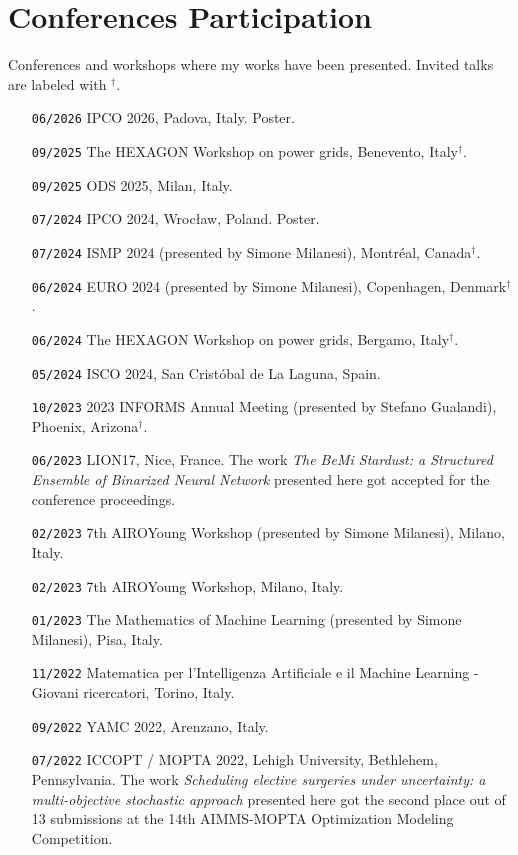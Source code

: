 \documentclass[11pt,a4paper]{article}
\begin{document}
\section*{Conferences Participation}
Conferences and workshops where my works have been presented. Invited talks are labeled with $^\dagger$.
\begin{itemize}[labelwidth=*,align=left, labelwidth=!]
\item[\texttt{06/2026}] IPCO 2026, Padova, Italy. Poster.
    \item[\texttt{09/2025}] The HEXAGON Workshop on power grids, Benevento, Italy$^\dagger$.
    \item[\texttt{09/2025}] ODS 2025, Milan, Italy. 
    \item[\texttt{07/2024}] IPCO 2024, Wrocław, Poland. Poster.
    \item[\texttt{07/2024}] ISMP 2024 (presented by Simone Milanesi), Montréal, Canada$^\dagger$.
    \item[\texttt{06/2024}] EURO 2024 (presented by Simone Milanesi), Copenhagen, Denmark$^\dagger$. 
    \item[\texttt{06/2024}] The HEXAGON Workshop on power grids, Bergamo, Italy$^\dagger$.
    \item[\texttt{05/2024}] ISCO 2024, San Cristóbal de La Laguna, Spain.
    \item[\texttt{10/2023}] 2023 INFORMS Annual Meeting (presented by Stefano Gualandi), Phoenix, Arizona$^\dagger$.
    \item[\texttt{06/2023}] LION17, Nice, France. The work \emph{The BeMi Stardust: a Structured Ensemble of Binarized Neural Network} presented here got accepted for the conference proceedings.
    \item[\texttt{02/2023}] 7th AIROYoung Workshop (presented by Simone Milanesi), Milano, Italy.
    \item[\texttt{02/2023}] 7th AIROYoung Workshop, Milano, Italy.
    \item[\texttt{01/2023}] The Mathematics of Machine Learning (presented by Simone Milanesi), Pisa, Italy.
    \item[\texttt{11/2022}] Matematica per l’Intelligenza Artificiale e il Machine Learning - Giovani ricercatori, Torino, Italy.
    \item[\texttt{09/2022}] YAMC 2022, Arenzano, Italy. 
    \item[\texttt{07/2022}] ICCOPT / MOPTA 2022, Lehigh University, Bethlehem, Pennsylvania. The work \emph{Scheduling elective surgeries under uncertainty: a multi-objective stochastic approach} presented here got the second place out of 13 submissions at the 14th AIMMS-MOPTA Optimization Modeling Competition. 
\end{itemize}
\end{document}
